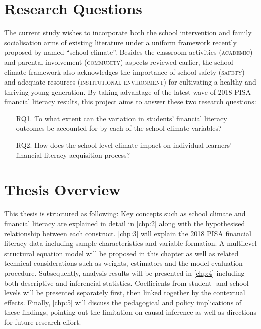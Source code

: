 \documentclass[a4paper,11pt,UKenglish,twoside,openright]{report}\usepackage[]{graphicx}\usepackage[]{color}
\begin{document}
\section{Research Questions}\label{sec:rq}

The current study wishes to incorporate both the school intervention and family socialisation arms of existing literature under a uniform framework recently proposed by \textcite{wang:2016} named ``school climate''. Besides the classroom activities (\textsc{academic}) and parental involvement (\textsc{community}) aspects reviewed earlier, the school climate framework also acknowledges the importance of school safety (\textsc{safety}) and adequate resources (\textsc{institutional environment}) for cultivating a healthy and thriving young generation. By taking advantage of the latest wave of 2018 PISA financial literacy results, this project aims to answer these two research questions:
\vspace{-0.75em} %
\begin{enumerate}
    \item[RQ1.] To what extent can the variation in students' financial literacy outcomes be accounted for by each of the school climate variables?
\vspace{-0.75em} %
    \item[RQ2.] How does the school-level climate impact on individual learners' financial literacy acquisition process?
\end{enumerate}
\vspace{-0.75em} %

\section{Thesis Overview}

This thesis is structured as following: Key concepts such as school climate and financial literacy are explained in detail in \cref{chp:2} along with the hypothesised relationship between each construct. \cref{chp:3} will explain the 2018 PISA financial literacy data including sample characteristics and variable formation. A multilevel structural equation model will be proposed in this chapter as well as related technical considerations such as weights, estimators and the model evaluation procedure. Subsequently, analysis results will be presented in \cref{chp:4} including both descriptive and inferencial statistics. Coefficients from student- and school-levels will be presented separately first, then linked together by the contextual effects. Finally, \cref{chp:5} will discuss the pedagogical and policy implications of these findings, pointing out the limitation on causal inference as well as directions for future research effort.
\end{document}

